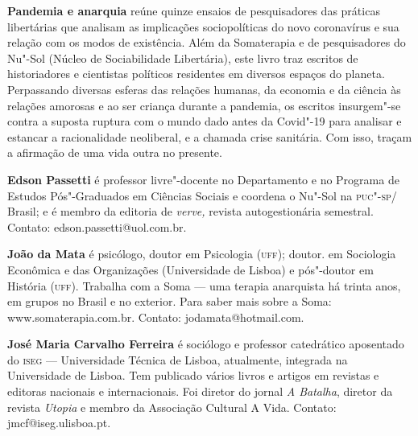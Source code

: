 
\textbf{Pandemia e anarquia} reúne quinze ensaios de pesquisadores das práticas libertárias que analisam as implicações sociopolíticas do novo coronavírus e sua relação com os modos de existência. Além da Somaterapia e de pesquisadores do Nu"-Sol (Núcleo de Sociabilidade Libertária), este livro traz escritos de historiadores e cientistas políticos residentes em diversos espaços do planeta. Perpassando diversas esferas das relações humanas, da economia e da ciência às relações amorosas e ao ser criança durante a pandemia, os escritos insurgem"-se contra a suposta ruptura com o mundo dado antes da Covid"-19 para analisar e estancar a racionalidade neoliberal, e a chamada crise sanitária. Com isso, traçam a afirmação de uma vida outra no presente.


\textbf{Edson Passetti} é professor livre"-docente no Departamento e no
Programa de Estudos Pós"-Graduados em Ciências Sociais e coordena o
Nu"-Sol na \textsc{puc"-sp}/ Brasil; e é membro da editoria de \emph{verve,} revista autogestionária semestral. Contato: edson.passetti@uol.com.br.

\textbf{João da Mata} é psicólogo, doutor em Psicologia (\textsc{uff}); doutor.
em Sociologia Econômica e das Organizações (Universidade de Lisboa) e
pós"-doutor em História (\textsc{uff}). Trabalha com a Soma --- uma terapia
anarquista há trinta anos, em grupos no Brasil e no exterior. Para saber
mais sobre a Soma:
www.somaterapia.com.br. Contato:
jodamata@hotmail.com.

\textbf{José Maria Carvalho Ferreira} é sociólogo e professor
catedrático aposentado do \textsc{iseg} --- Universidade Técnica de Lisboa,
atualmente, integrada na Universidade de Lisboa. Tem publicado vários
livros e artigos em revistas e editoras nacionais e internacionais. Foi
diretor do jornal \emph{A Batalha}, diretor da revista \emph{Utopia} e
membro da Associação Cultural A Vida. Contato:
jmcf@iseg.ulisboa.pt.


